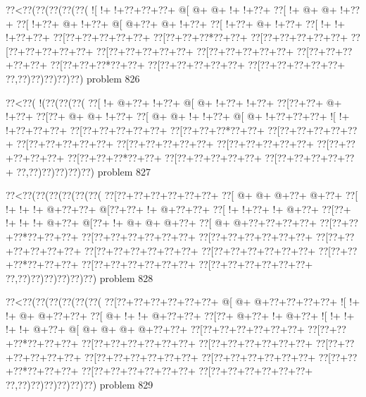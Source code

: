 \vbox{\vbox{\goo
\0??<\0??(\0??(\0??(\0??(\0??(
\- ![\- !+\- !+\0??+\0??+\0??+
\- @[\- @+\- @+\- !+\- !+\0??+
\0??[\- !+\- @+\- @+\- !+\0??+
\0??[\- !+\0??+\- @+\- !+\0??+
\- @[\- @+\0??+\- @+\- !+\0??+
\0??[\- !+\0??+\- @+\- !+\0??+
\0??[\- !+\- !+\- !+\0??+\0??+
\0??[\0??+\0??+\0??+\0??+\0??+
\0??[\0??+\0??+\0??*\0??+\0??+
\0??[\0??+\0??+\0??+\0??+\0??+
\0??[\0??+\0??+\0??+\0??+\0??+
\0??[\0??+\0??+\0??+\0??+\0??+
\0??[\0??+\0??+\0??+\0??+\0??+
\0??[\0??+\0??+\0??+\0??+\0??+
\0??[\0??+\0??+\0??*\0??+\0??+
\0??[\0??+\0??+\0??+\0??+\0??+
\0??[\0??+\0??+\0??+\0??+\0??+
\0??,\0??)\0??)\0??)\0??)\0??)
}
\hfil problem 826\hfil\break
}

\vbox{\vbox{\goo
\0??<\0??(\- !(\0??(\0??(\0??(
\0??[\- !+\- @+\0??+\- !+\0??+
\- @[\- @+\- !+\0??+\- !+\0??+
\0??[\0??+\0??+\- @+\- !+\0??+
\0??[\0??+\- @+\- @+\- !+\0??+
\0??[\- @+\- @+\- !+\- !+\0??+
\- @[\- @+\- !+\0??+\0??+\0??+
\- ![\- !+\- !+\0??+\0??+\0??+
\0??[\0??+\0??+\0??+\0??+\0??+
\0??[\0??+\0??+\0??*\0??+\0??+
\0??[\0??+\0??+\0??+\0??+\0??+
\0??[\0??+\0??+\0??+\0??+\0??+
\0??[\0??+\0??+\0??+\0??+\0??+
\0??[\0??+\0??+\0??+\0??+\0??+
\0??[\0??+\0??+\0??+\0??+\0??+
\0??[\0??+\0??+\0??*\0??+\0??+
\0??[\0??+\0??+\0??+\0??+\0??+
\0??[\0??+\0??+\0??+\0??+\0??+
\0??,\0??)\0??)\0??)\0??)\0??)
}
\hfil problem 827\hfil\break
}

\vbox{\vbox{\goo
\0??<\0??(\0??(\0??(\0??(\0??(\0??(
\0??[\0??+\0??+\0??+\0??+\0??+\0??+
\0??[\- @+\- @+\- @+\0??+\- @+\0??+
\0??[\- !+\- !+\- !+\- @+\0??+\0??+
\- @[\0??+\0??+\- !+\- @+\0??+\0??+
\0??[\- !+\- !+\0??+\- !+\- @+\0??+
\0??[\0??+\- !+\- !+\- !+\- @+\0??+
\- @[\0??+\- !+\- @+\- @+\- @+\0??+
\0??[\- @+\- @+\0??+\0??+\0??+\0??+
\0??[\0??+\0??+\0??*\0??+\0??+\0??+
\0??[\0??+\0??+\0??+\0??+\0??+\0??+
\0??[\0??+\0??+\0??+\0??+\0??+\0??+
\0??[\0??+\0??+\0??+\0??+\0??+\0??+
\0??[\0??+\0??+\0??+\0??+\0??+\0??+
\0??[\0??+\0??+\0??+\0??+\0??+\0??+
\0??[\0??+\0??+\0??*\0??+\0??+\0??+
\0??[\0??+\0??+\0??+\0??+\0??+\0??+
\0??[\0??+\0??+\0??+\0??+\0??+\0??+
\0??,\0??)\0??)\0??)\0??)\0??)\0??)
}
\hfil problem 828\hfil\break
}

\vbox{\vbox{\goo
\0??<\0??(\0??(\0??(\0??(\0??(\0??(
\0??[\0??+\0??+\0??+\0??+\0??+\0??+
\- @[\- @+\- @+\0??+\0??+\0??+\0??+
\- ![\- !+\- !+\- @+\- @+\0??+\0??+
\0??[\- @+\- !+\- !+\- @+\0??+\0??+
\0??[\0??+\- @+\0??+\- !+\- @+\0??+
\- ![\- !+\- !+\- !+\- !+\- @+\0??+
\- @[\- @+\- @+\- @+\- @+\0??+\0??+
\0??[\0??+\0??+\0??+\0??+\0??+\0??+
\0??[\0??+\0??+\0??*\0??+\0??+\0??+
\0??[\0??+\0??+\0??+\0??+\0??+\0??+
\0??[\0??+\0??+\0??+\0??+\0??+\0??+
\0??[\0??+\0??+\0??+\0??+\0??+\0??+
\0??[\0??+\0??+\0??+\0??+\0??+\0??+
\0??[\0??+\0??+\0??+\0??+\0??+\0??+
\0??[\0??+\0??+\0??*\0??+\0??+\0??+
\0??[\0??+\0??+\0??+\0??+\0??+\0??+
\0??[\0??+\0??+\0??+\0??+\0??+\0??+
\0??,\0??)\0??)\0??)\0??)\0??)\0??)
}
\hfil problem 829\hfil\break
}


